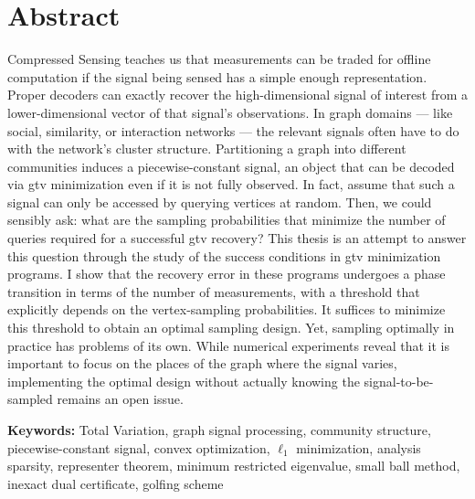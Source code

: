 
\cleardoublepage{}
\chapter*{Abstract}

\vspace*{\fill}

Compressed Sensing teaches us that measurements can be traded for offline computation if the signal being sensed has a simple enough representation. Proper decoders can exactly recover the high-dimensional signal of interest from a lower-dimensional vector of that signal's observations. In graph domains --- like social, similarity, or interaction networks --- the relevant signals often have to do with the network's cluster structure. Partitioning a graph into different communities induces a piecewise-constant signal, an object that can be decoded via \acrfull{gtv} minimization even if it is not fully observed. In fact, assume that such a signal can only be accessed by querying vertices at random. Then, we could sensibly ask: what are the sampling probabilities that minimize the number of queries required for a successful \acrshort{gtv} recovery? This thesis is an attempt to answer this question through the study of the success conditions in \acrshort{gtv} minimization programs. I show that the recovery error in these programs undergoes a phase transition in terms of the number of measurements, with a threshold that explicitly depends on the vertex-sampling probabilities. It suffices to minimize this threshold to obtain an optimal sampling design. Yet, sampling optimally in practice has problems of its own. While numerical experiments reveal that it is important to focus on the places of the graph where the signal varies, implementing the optimal design without actually knowing the signal-to-be-sampled remains an open issue.

\vspace*{\fill}

\textbf{Keywords:} Total Variation, graph signal processing, community structure, piecewise-constant signal, convex optimization, $\ell_1$ minimization, analysis sparsity, representer theorem, minimum restricted eigenvalue, small ball method, inexact dual certificate, golfing scheme

\vfill


